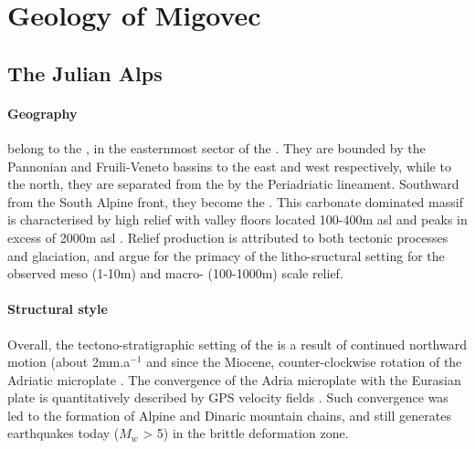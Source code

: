 


\section{Geology of Migovec}

\subsection{The Julian Alps}
\label{sec:The Julian Alps}

\paragraph{Geography} 
\label{par:Geography} 
 belong to the , in the easternmost sector of the  \citep{bavec2004late}. 
They  are bounded by the Pannonian and  Fruili-Veneto bassins to the east and west respectively, while to the north, they are separated from the  by the Periadriatic lineament. Southward from the South Alpine front, they become the  \citep{placer1998contribution,burrato2008sources}.
This carbonate dominated massif is characterised by high relief with valley floors located 100-400m asl and peaks in excess of 2000m asl  \citep{vsmuc2009tectonic}. Relief production is attributed to both tectonic processes and glaciation, and \citet{vsmuc2009tectonic} argue for the primacy of the litho-sructural setting for the observed meso (1-10m) and macro- (100-1000m) scale relief.


\paragraph{Structural style}
\label{par:Structural style}
Overall, the tectono-stratigraphic setting  of the  is a result of continued northward motion (about 2mm.a$^{-1}$ \citep{burrato2008sources} and since the Miocene,  counter-clockwise rotation of the Adriatic microplate \citep{marton2003palaeomagnetic}. 
The convergence of the Adria microplate with the Eurasian plate is quantitatively described by GPS velocity fields \citep{grenerczy2005tectonic}. 
Such convergence was led to the formation of Alpine and Dinaric mountain chains, and still generates earthquakes today ($M_w$ > 5) in the brittle deformation zone.

